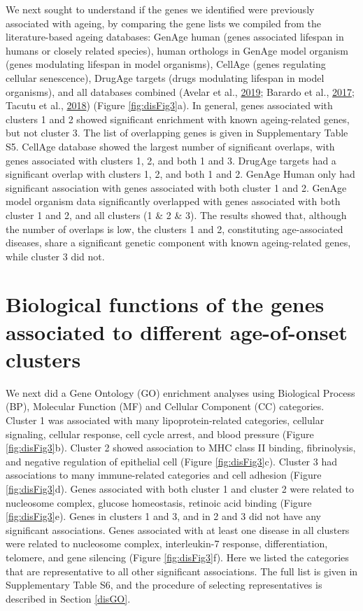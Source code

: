 \documentclass[12pt,twoside]{unicam}
\begin{document}
We next sought to understand if the genes we identified were previously associated with ageing, by comparing the gene lists we compiled from the literature-based ageing databases: GenAge human (genes associated lifespan in humans or closely related species), human orthologs in GenAge model organism (genes modulating lifespan in model organisms), CellAge (genes regulating cellular senescence), DrugAge targets (drugs modulating lifespan in model organisms), and all databases combined (Avelar et al., \protect\hyperlink{ref-Avelar2019}{2019}; Barardo et al., \protect\hyperlink{ref-Barardo2017}{2017}; Tacutu et al., \protect\hyperlink{ref-Tacutu2018}{2018}) (Figure \ref{fig:disFig3}a). In general, genes associated with clusters 1 and 2 showed significant enrichment with known ageing-related genes, but not cluster 3. The list of overlapping genes is given in Supplementary Table S5. CellAge database showed the largest number of significant overlaps, with genes associated with clusters 1, 2, and both 1 and 3. DrugAge targets had a significant overlap with clusters 1, 2, and both 1 and 2. GenAge Human only had significant association with genes associated with both cluster 1 and 2. GenAge model organism data significantly overlapped with genes associated with both cluster 1 and 2, and all clusters (1 \& 2 \& 3). The results showed that, although the number of overlaps is low, the clusters 1 and 2, constituting age-associated diseases, share a significant genetic component with known ageing-related genes, while cluster 3 did not.

\hypertarget{biological-functions-of-the-genes-associated-to-different-age-of-onset-clusters}{%
\section{Biological functions of the genes associated to different age-of-onset clusters}\label{biological-functions-of-the-genes-associated-to-different-age-of-onset-clusters}}

We next did a Gene Ontology (GO) enrichment analyses using Biological Process (BP), Molecular Function (MF) and Cellular Component (CC) categories. Cluster 1 was associated with many lipoprotein-related categories, cellular signaling, cellular response, cell cycle arrest, and blood pressure (Figure \ref{fig:disFig3}b). Cluster 2 showed association to MHC class II binding, fibrinolysis, and negative regulation of epithelial cell (Figure \ref{fig:disFig3}c). Cluster 3 had associations to many immune-related categories and cell adhesion (Figure \ref{fig:disFig3}d). Genes associated with both cluster 1 and cluster 2 were related to nucleosome complex, glucose homeostasis, retinoic acid binding (Figure \ref{fig:disFig3}e). Genes in clusters 1 and 3, and in 2 and 3 did not have any significant associations. Genes associated with at least one disease in all clusters were related to nucleosome complex, interleukin-7 response, differentiation, telomere, and gene silencing (Figure \ref{fig:disFig3}f). Here we listed the categories that are representative to all other significant associations. The full list is given in Supplementary Table S6, and the procedure of selecting representatives is described in Section \ref{disGO}.
\end{document}
